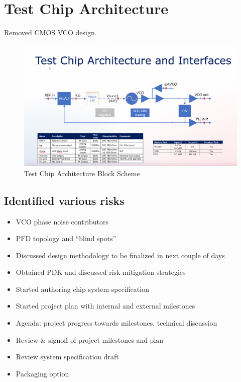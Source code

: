 \documentclass{article}
\begin{document}
\begin{itemize}
\end{itemize}


\newpage





\section{Test Chip Architecture}

Removed CMOS VCO design.

\begin{figure}[ht!] %
	\centering %
	\includegraphics[width=0.5\linewidth]{Figures/test-chip-arch.png}
	\caption{Test Chip Architecture Block Scheme}
	\label{fig:test-chip-arch}
\end{figure}

\subsection*{Identified various risks} %

\begin{itemize}
	\item VCO phase noise contributors
	\item PFD topology and “blind spots” %
	\item Discussed design methodology to be finalized in next couple of days
	\item Obtained PDK and discussed risk mitigation strategies %
	\item Started authoring chip system specification
	\item Started project plan with internal and external milestones
	\item Agenda: project progress towards milestones, technical discussion
	\item Review \& signoff of project milestones and plan
	\item Review system specification draft 
	\item Packaging option
\end{itemize}
\end{document}
